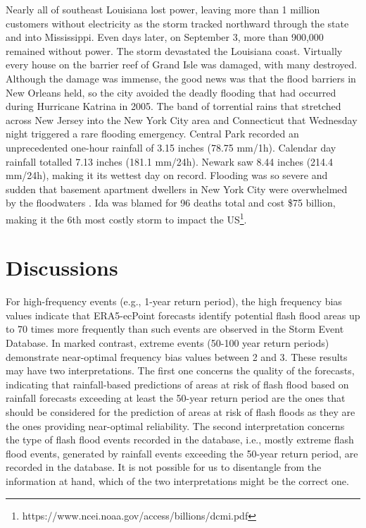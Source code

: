 Nearly  all of southeast Louisiana lost power, leaving more than 1 million customers without electricity as the storm tracked northward through the state and into Mississippi. Even days later, on September 3, more than 900,000 remained without power. The storm devastated the Louisiana coast. Virtually every house on the barrier reef of Grand Isle was damaged, with many destroyed. Although the damage was immense, the good news was that the flood barriers in New Orleans held, so the city avoided the deadly flooding that had occurred during Hurricane Katrina in 2005. The band of torrential rains that stretched across New Jersey into the New York City area and Connecticut that Wednesday night triggered a rare flooding emergency. Central Park recorded an unprecedented one-hour rainfall of 3.15 inches (78.75 mm/1h). Calendar day rainfall totalled 7.13 inches (181.1 mm/24h). Newark saw 8.44 inches (214.4 mm/24h), making it its wettest day on record. Flooding was so severe and sudden that basement apartment dwellers in New York City were overwhelmed by the floodwaters \citep{LeComte_2022}. Ida was blamed for 96 deaths total and cost \$75 billion, making it the 6th most costly storm to impact the US\footnote{https://www.ncei.noaa.gov/access/billions/dcmi.pdf}.



\section{Discussions}
\label{flash_flood_focused_verification_rainfall_based_ff_DISCUSSIONS}

For  high-frequency events (e.g., 1-year return period), the high frequency bias values indicate that ERA5-ecPoint forecasts identify potential flash flood areas up to 70 times more frequently than such events are observed in the Storm Event Database. In marked contrast, extreme events (50-100 year return periods) demonstrate near-optimal frequency bias values between 2 and 3. These results may have two interpretations. The first one concerns the quality of the forecasts, indicating that rainfall-based predictions of areas at risk of flash flood based on rainfall forecasts exceeding at least the 50-year return period are the ones that should be considered for the prediction of areas at risk of flash floods as they are the ones providing near-optimal reliability. The second interpretation concerns the type of flash flood events recorded in the database, i.e., mostly extreme flash flood events, generated by rainfall events exceeding the 50-year return period, are recorded in the database. It is not possible for us to disentangle from the information at hand, which of the two interpretations might be the correct one. 

